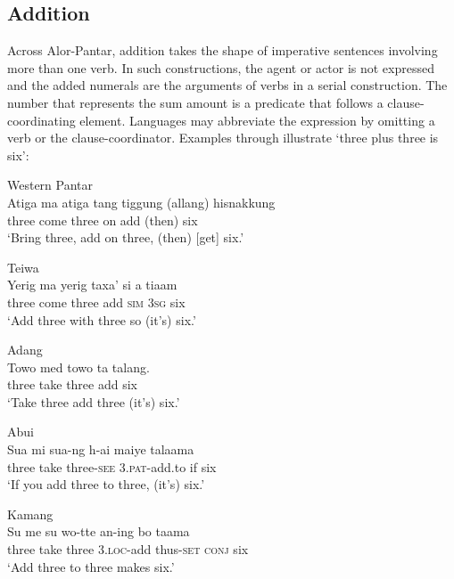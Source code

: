 \subsection{Addition}
\label{sec:8:Addition}
Across Alor-Pantar, addition takes the shape of imperative sentences involving more than one verb. In such constructions, the agent or actor is not expressed and the added numerals are the arguments of verbs in a serial construction. The number that represents the sum amount is a predicate that follows a clause-coordinating element. Languages may abbreviate the expression by omitting a verb or the clause-coordinator. Examples  through  illustrate `three plus three is six':


\ea%
\label{bkm:Ref342663714}
{\upshape Western Pantar}\\
\gll Atiga  ma{\upshapefootnotemark}  atiga  tang  tiggung  (allang)  hisnakkung\\  
   three   come  three  on  add  (then)  six \\
\glt  `Bring three, add on three, (then) [get] six.'
\z


\ea
\label{ex:8:1237}
 
{\upshape Teiwa}\\
 \gll Yerig  ma  yerig  taxa'   si  a  tiaam\\
   three  come  three  add  \textsc{sim}  \textsc{3sg} six \\
 \glt`Add three with three so (it's) six.'
\z
 
\ea
\label{ex:8:1238}
{\upshape Adang}\\ 
 \gll Towo  med  towo  ta  talang.\\
    three   take   three   add   six\\
 \glt `Take three add three (it's) six.'
\z

\ea
\label{ex:8:1239}
{\upshape Abui}\\
 \gll Sua  mi  sua-ng  h-ai  maiye  talaama\\
  three  take  three-\textsc{see}  \textsc{3.pat}{}-add.to  if  six \\
 \glt  `If you add three to three, (it's) six.'  
\z




\ea%
\label{bkm:Ref342663723}
{\upshape Kamang}\\
\gll   Su  me  su  wo-tte  an-ing  bo  taama\\  
   three   take  three  3.\textsc{loc}{}-add  thus-\textsc{set}   \textsc{conj}  six  \\
\glt `Add three to three makes six.'  
\z



